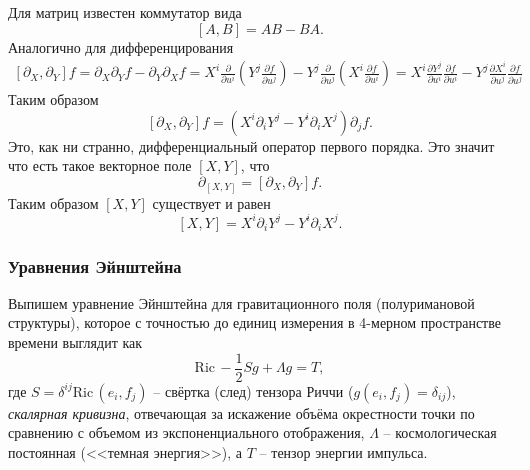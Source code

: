 Для матриц известен коммутатор вида
$$
    \left[A, B\right] = AB - BA.
$$
Аналогично для дифференцирования
\begin{align*}
    \left[\partial_X, \partial_Y \right] f
    =
    \partial_X \partial_Y f - \partial_Y \partial_X f 
    =
    X^i \frac{\partial }{\partial u^i}
     \left(Y^j \frac{\partial f}{\partial u^j} \right)
    -
    Y^j \frac{\partial }{\partial u^j} 
    \left(X^i \frac{\partial f}{\partial u^i} \right) 
    = X^i \frac{\partial Y^j}{\partial u^i} \frac{\partial f}{\partial u^i} 
    -
    Y^j \frac{\partial X^i}{\partial u^j} \frac{\partial f}{\partial u^j}
\end{align*}
Таким образом
\begin{equation}
    \left[\partial_X, \partial_Y \right] f
    =
    \left(
    X^i \partial_i Y^j - Y^i \partial_i X^j
    \right) \partial_j f
    .
\end{equation}
Это, как ни странно, дифференциальный оператор первого порядка. Это значит что есть такое векторное поле $\left[X, Y\right]$, что
$$
    \partial_{\left[X, Y\right]} = \left[\partial_X, \partial_Y\right] f.
$$
Таким образом $\left[X, Y\right]$ существует и равен
\begin{equation}
    \left[X, Y\right] =   X^i \partial_i Y^j - Y^i \partial_i X^j.
\end{equation}

\subsubsection*{Уравнения Эйнштейна}
Выпишем уравнение Эйнштейна для гравитационного поля (полуримановой структуры), которое с точностью до единиц измерения в 4-мерном пространстве времени выглядит как
\begin{equation*}
    \text{Ric}\, - \frac{1}{2} S g + \Lambda g = T,
\end{equation*}
где $S = \delta^{ij} \text{Ric}\, (e_i, f_j )$ -- свёртка (след) тензора Риччи ($g(e_i, f_j)=\delta_{ij}$), \textit{скалярная кривизна}, отвечающая за искажение объёма окрестности точки по сравнению с объемом из экспоненциального отображения, $\Lambda$ -- космологическая постоянная (<<темная энергия>>), а $T$ -- тензор энергии импульса.